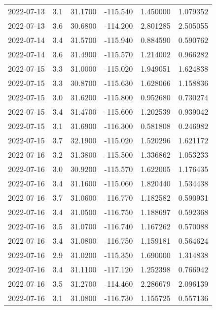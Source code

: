 \begin{tabular}{lrrrrr}
2022-07-13 &       3.1 &  31.1700 &  -115.540 &         1.450000 &         1.079352 \\
2022-07-13 &       3.6 &  30.6800 &  -114.200 &         2.801285 &         2.505055 \\
2022-07-14 &       3.4 &  31.5700 &  -115.940 &         0.884590 &         0.590762 \\
2022-07-14 &       3.6 &  31.4900 &  -115.570 &         1.214002 &         0.966282 \\
2022-07-15 &       3.3 &  31.0000 &  -115.020 &         1.949051 &         1.624838 \\
2022-07-15 &       3.3 &  30.8700 &  -115.630 &         1.628066 &         1.158836 \\
2022-07-15 &       3.0 &  31.6200 &  -115.800 &         0.952680 &         0.730274 \\
2022-07-15 &       3.4 &  31.4700 &  -115.600 &         1.202539 &         0.939042 \\
2022-07-15 &       3.1 &  31.6900 &  -116.300 &         0.581808 &         0.246982 \\
2022-07-15 &       3.7 &  32.1900 &  -115.020 &         1.520296 &         1.621172 \\
2022-07-16 &       3.2 &  31.3800 &  -115.500 &         1.336862 &         1.053233 \\
2022-07-16 &       3.0 &  30.9200 &  -115.570 &         1.622005 &         1.176435 \\
2022-07-16 &       3.4 &  31.1600 &  -115.060 &         1.820440 &         1.534438 \\
2022-07-16 &       3.7 &  31.0600 &  -116.770 &         1.182582 &         0.590931 \\
2022-07-16 &       3.4 &  31.0500 &  -116.750 &         1.188697 &         0.592368 \\
2022-07-16 &       3.5 &  31.0700 &  -116.740 &         1.167262 &         0.570088 \\
2022-07-16 &       3.4 &  31.0800 &  -116.750 &         1.159181 &         0.564624 \\
2022-07-16 &       2.9 &  31.0200 &  -115.350 &         1.690000 &         1.314838 \\
2022-07-16 &       3.4 &  31.1100 &  -117.120 &         1.252398 &         0.766942 \\
2022-07-16 &       3.5 &  31.2700 &  -114.460 &         2.286679 &         2.096139 \\
2022-07-16 &       3.1 &  31.0800 &  -116.730 &         1.155725 &         0.557136 \\

\end{tabular}
